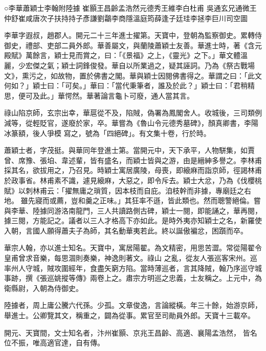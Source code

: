 
\begin{pinyinscope}

 ○李華蕭穎士李翰附陸據
 崔顥王昌齡孟浩然元德秀王維李白杜甫
 吳通玄兄通微王仲舒崔咸唐次子扶持持子彥謙劉鸘李商隱溫庭筠薛逢子廷珪李拯李巨川司空圖



 李華字遐叔，趙郡人。開元二十三年進士擢第。天寶中，登朝為監察御史。累轉侍御史，禮部、吏部二員外郎。華善屬文，與蘭陵蕭穎士友善。華進士時，著《含元殿賦》萬餘言，穎士見而賞之，曰：「《景福》之上，《靈光》之下。」華文體溫
 麗，少宏傑之氣；穎士詞鋒俊發。華自以所業過之，疑其誣詞。乃為《祭古戰場文》，熏污之，如故物，置於佛書之閣。華與穎士因閱佛書得之。華謂之曰：「此文何如？」穎士曰：「可矣。」華曰：「當代秉筆者，誰及於此？」穎士曰：「君稍精思，便可及此。」華愕然。華著論言龜卜可廢，通人當其言。



 祿山陷京師，玄宗出幸，華扈從不及，陷賊，偽署為鳳閣舍人。收城後，三司類例減等，從輕貶官，遂廢於家，卒。華嘗為《魯山令元德秀墓碑》，顏真卿書，李陽冰篆額，後人爭模
 寫之，號為「四絕碑」。有文集十卷，行於時。



 蕭穎士者，字茂挺。與華同年登進士第。當開元中，天下承平，人物駢集，如賈曾、席豫、張垍、韋述輩，皆有盛名，而穎士皆與之游，由是縉紳多譽之。李林甫採其名，欲拔用之，乃召見。時穎士寓居廣陵，母喪，即縗麻而詣京師，徑謁林甫於政事省。林甫素不識，遽見縗麻，大惡之，即令斥去。穎士大忿，乃為《伐櫻桃賦》以刺林甫云：「擢無庸之瑣質，因本枝而自庇。洎枝幹而非據，專廟廷之右地。
 雖先寢而或薦，豈和羹之正味。」其狂率不遜，皆此類也。然而聰警絕倫。嘗與李華、陸據同游洛南龍門，三人共讀路側古碑，穎士一閱，即能誦之，華再閱，據三閱，方能記之。議者以三人才格高下亦如此。是時外夷亦知穎士之名，新羅使入朝，言國人願得蕭夫子為師，其名動華夷若此。終以誕傲褊忿，困躓而卒。



 華宗人翰，亦以進士知名。天寶中，寓居陽翟。為文精密，用思苦澀。常從陽翟令皇甫曾求音樂，每思涸則奏樂，神逸則著文。祿山
 之亂，從友人張巡客宋州。巡率州人守城，賊攻圍經年，食盡矢窮方陷。當時薄巡者，言其降賊，翰乃序巡守城事跡，撰《張巡姚摐等傳》兩卷上之。肅宗方明巡之忠義，士友稱之。上元中，為衛縣尉，入朝為侍御史。



 陸據者，周上庸公騰六代孫。少孤。文章俊逸，言論縱橫。年三十餘，始游京師，舉進士。公卿覽其文，稱重之，闢為從事。累官至司勛員外郎。天寶十三載卒。



 開元、天寶間，文士知名者，汴州崔顥、京兆王昌齡、高適、襄陽孟浩然，
 皆名位不振，唯高適官達，自有傳。




\end{pinyinscope}
